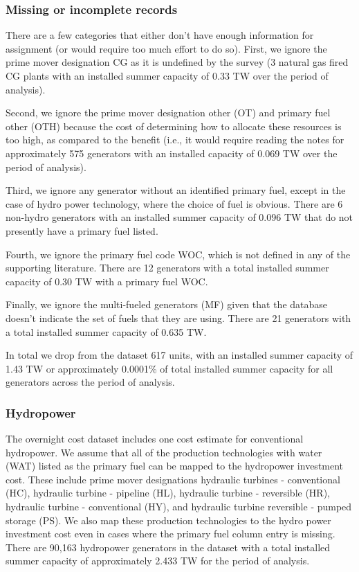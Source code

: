 \documentclass[10pt]{amsart}
\begin{document}
\subsubsection{Missing or incomplete records}
There are a few categories that either don't have enough information for assignment (or would require too much effort to do so). 
First, we ignore the prime mover designation CG as it is undefined by the survey (3 natural gas fired CG plants with an installed summer capacity of 0.33 TW over the period of analysis).

Second, we ignore the prime mover designation other (OT) and primary fuel other (OTH) because the cost of determining how to allocate these resources is too high, as compared to the benefit (i.e., it would require reading the notes for approximately 575 generators with an installed capacity of 0.069 TW over the period of analysis).

Third, we ignore any generator without an identified primary fuel, except in the case of hydro power technology, where the choice of fuel is obvious.
There are 6 non-hydro generators with an installed summer capacity of 0.096 TW that do not presently have a primary fuel listed.

Fourth, we ignore the primary fuel code WOC, which is not defined in any of the supporting literature. 
There are 12 generators with a total installed summer capacity of 0.30 TW with a primary fuel WOC.   

Finally, we ignore the multi-fueled generators (MF) given that the database doesn't indicate the set of fuels that they are using.
There are 21 generators with a total installed summer capacity of 0.635 TW. 

In total we drop from the dataset 617 units, with an installed summer capacity of 1.43 TW or approximately 0.0001\% of total installed summer capacity for all generators across the period of analysis.

\subsubsection{Hydropower}
The overnight cost dataset includes one cost estimate for conventional hydropower.
We assume that all of the production technologies with water (WAT) listed as the primary fuel can be mapped to the hydropower investment cost.
These include prime mover designations hydraulic turbines - conventional (HC), hydraulic turbine - pipeline (HL), hydraulic turbine - reversible (HR), hydraulic turbine - conventional (HY), and hydraulic turbine reversible - pumped storage (PS). 
We also map these production technologies to the hydro power investment cost even in cases where the primary fuel column entry is missing. 
There are 90,163 hydropower generators in the dataset with a total installed summer capacity of approximately 2.433 TW for the period of analysis. 
\end{document}
